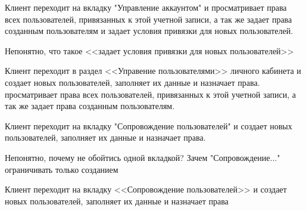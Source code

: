 {


\begin{wiki}
Клиент переходит на вкладку "Управление аккаунтом" и просматривает права всех пользователей, привязанных к этой учетной записи, а так же задает права созданным пользователям и задает условия привязки для новых пользователей.
\end{wiki}


\begin{teamidea}
Непонятно, что такое <<задает условия привязки для новых пользователей>>
\end{teamidea}


\begin{itogo}
Клиент переходит в раздел <<Управение пользователями>> личного кабинета и создает новых пользователей, заполняет их данные и назначает права. просматривает права всех пользователей, привязанных к этой учетной записи, а так же задает права созданным пользователям.
\end{itogo}
}


{


\begin{wiki}
Клиент переходит на вкладку "Сопровождение пользователей" и создает новых пользователей, заполняет их данные и назначает права.
\end{wiki}

\begin{teamidea}
Непонятно, почему не обойтись одной вкладкой? Зачем "Сопровождение..." ограничивать только созданием
\end{teamidea}


\begin{itogo}
Клиент переходит на вкладку <<Сопровождение пользователей>> и создает новых пользователей, заполняет их данные и назначает права
\end{itogo}

}
\ifcand
